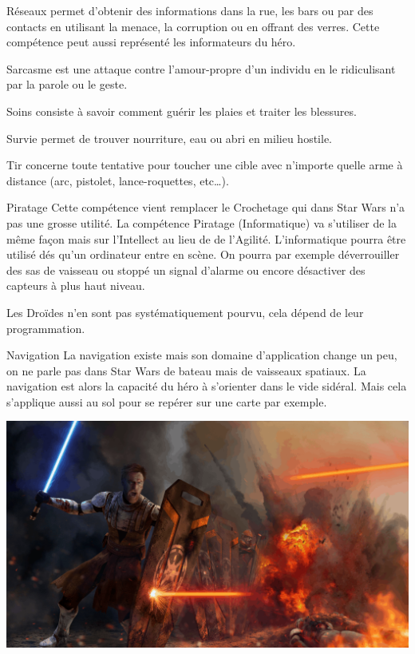 \begin{description}[align=left]
    \item [Réseaux (Int)]
        Réseaux permet d’obtenir des informations dans la rue, les bars ou par des contacts en utilisant la menace, la corruption ou en offrant des verres. Cette compétence peut aussi représenté les informateurs du héro.

    \item [Sarcasme (Int)]
        Sarcasme est une attaque contre l’amour-propre d’un individu en le ridiculisant par la parole ou le geste.

    \item [Soins (Int)]
        Soins consiste à savoir comment guérir les plaies et traiter les blessures.

    \item [Survie (Int)]
        Survie permet de trouver nourriture, eau ou abri en milieu hostile.

    \item [Tir (Agi)]
        Tir concerne toute tentative pour toucher une cible avec n’importe quelle arme à distance (arc, pistolet, lance-roquettes, etc\ldots).
\end{description}

\begin{paperbox}{Piratage}
    Cette compétence vient remplacer le Crochetage qui dans Star Wars n’a pas une grosse utilité. La compétence Piratage (Informatique) va s’utiliser de la même façon mais sur l’Intellect au lieu de de l’Agilité. L’informatique pourra être utilisé dés qu’un ordinateur entre en scène. On pourra par exemple déverrouiller des sas de vaisseau ou stoppé un signal d’alarme ou encore désactiver des capteurs à plus haut niveau.

    Les Droïdes n’en sont pas systématiquement pourvu, cela dépend de leur programmation.
\end{paperbox}

\begin{paperbox}{Navigation}
    La navigation existe mais son domaine d’application change un peu, on ne parle pas dans Star Wars de bateau mais de vaisseaux spatiaux. La navigation est alors la capacité du héro à s’orienter dans le vide sidéral. Mais cela s’applique aussi au sol pour se repérer sur une carte par exemple.
\end{paperbox}

\vspace*{\fill}
\hspace*{-0.5\columnsep}
\includegraphics[width=\textwidth]{img/personnages/skills-01.png}